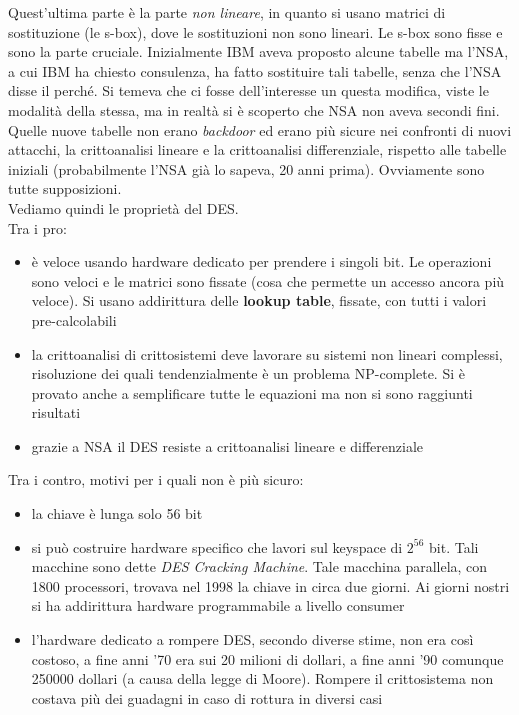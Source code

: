 \documentclass[a4paper,12pt, oneside]{book}
\begin{document}
Quest'ultima parte è la parte \textit{non lineare}, in quanto si usano matrici
di sostituzione (le s-box), dove le sostituzioni non sono lineari. Le s-box sono
fisse e sono la parte cruciale. Inizialmente IBM aveva proposto alcune tabelle
ma l'NSA, a cui IBM ha chiesto consulenza, ha fatto sostituire tali tabelle,
senza che l'NSA disse il perché. Si temeva che ci fosse dell'interesse un questa
modifica, viste le modalità della stessa, ma in realtà si è scoperto che NSA non
aveva secondi fini. Quelle nuove tabelle non erano \textit{backdoor} ed erano
più sicure nei confronti di nuovi attacchi, la crittoanalisi lineare e la
crittoanalisi differenziale, rispetto alle tabelle iniziali (probabilmente l'NSA
già lo sapeva, 20 anni prima). Ovviamente sono tutte supposizioni.\\
Vediamo quindi le proprietà del DES. \\
Tra i pro:
\begin{itemize}
  \item è veloce usando hardware dedicato per prendere i singoli bit. Le
  operazioni sono veloci e le matrici sono fissate (cosa che permette un accesso
  ancora più veloce). Si usano addirittura delle \textbf{lookup table}, fissate,
  con tutti i valori pre-calcolabili
  \item la crittoanalisi di crittosistemi deve lavorare su sistemi non lineari
  complessi, risoluzione dei quali tendenzialmente è un problema NP-complete. Si
  è provato anche a semplificare tutte le equazioni ma non si sono raggiunti
  risultati  
  \item grazie a NSA il DES resiste a crittoanalisi lineare e differenziale
\end{itemize}
Tra i contro, motivi per i quali non è più sicuro:
\begin{itemize}
  \item la chiave è lunga solo 56 bit
  \item si può costruire hardware specifico che lavori sul keyspace di $2^{56}$
  bit. Tali macchine sono dette \textit{DES Cracking Machine}. Tale
  macchina parallela, con 1800 processori, trovava nel 1998 la chiave in circa
  due giorni. Ai giorni nostri si ha addirittura hardware programmabile a
  livello consumer 
  \item l'hardware dedicato a rompere DES, secondo diverse stime, non era così
  costoso, a fine anni '70 
  era sui 20 milioni di dollari, a fine anni '90 comunque 250000
  dollari (a causa della legge di Moore). Rompere il crittosistema non costava
  più dei guadagni in caso di rottura in diversi casi  
\end{itemize}
\end{document}
